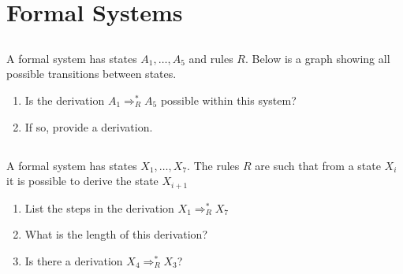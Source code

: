 \documentclass[twocolumn]{article}
\begin{document}
\section{Formal Systems}

\subsection{}

    A formal system has states $A_1, \dots, A_5$ and rules $R$. Below is a graph showing all possible transitions between states.

    \begin{figure}[h!]
        \centering
    \end{figure}

    \begin{enumerate}
        \item Is the derivation $A_1 \Rightarrow^*_R A_5$ possible within this system?
        \item If so, provide a derivation.
    \end{enumerate}

\subsection{}

    A formal system has states $X_1, \dots, X_{7}$. The rules $R$ are such that from a state $X_i$ it is possible to derive the state $X_{i+1}$

    \begin{enumerate}
        \item List the steps in the derivation $X_1 \Rightarrow^*_R X_7$
        \item What is the length of this derivation?
        \item Is there a derivation $X_4 \Rightarrow^*_R X_3$?
    \end{enumerate}
\end{document}
